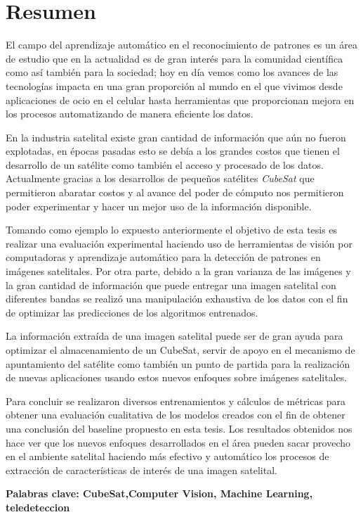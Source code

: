 \chapter*{Resumen}
\label{chap:resumen}

El campo del aprendizaje automático en el reconocimiento de patrones es un área de estudio que en la actualidad es de gran interés para la comunidad científica como así también para la sociedad; hoy en día vemos como los avances de las tecnologías impacta en una gran proporción al mundo en el que vivimos desde aplicaciones de ocio en el celular hasta herramientas que proporcionan mejora en los procesos automatizando de manera eficiente los datos.

En la industria satelital existe gran cantidad de información que aún no fueron explotadas, en épocas pasadas esto se debía a los grandes costos que tienen el desarrollo de un satélite como también el acceso y procesado de los datos. Actualmente gracias a los desarrollos de pequeños satélites \textit{CubeSat} que permitieron abaratar costos y al avance del poder de cómputo nos permitieron poder experimentar y hacer un mejor uso de la información disponible.

Tomando como ejemplo lo expuesto anteriormente el objetivo de esta tesis es realizar una evaluación experimental haciendo uso  de herramientas de visión por computadoras y aprendizaje automático para la detección de patrones en imágenes satelitales. 
Por otra parte, debido a la gran varianza de las imágenes y la gran cantidad de información que puede entregar una imagen satelital con diferentes bandas se realizó una manipulación exhaustiva de los datos con el fin de optimizar las predicciones de los algoritmos entrenados. 

La información extraída de una imagen satelital puede ser de gran ayuda para optimizar el almacenamiento de un CubeSat, servir de apoyo en el mecanismo de apuntamiento del satélite como también un punto de partida para la realización de nuevas aplicaciones usando estos nuevos enfoques sobre imágenes satelitales.

Para concluir se realizaron diversos entrenamientos y cálculos de métricas para obtener una evaluación cualitativa de los modelos creados con el fin de obtener una conclusión del baseline propuesto en esta tesis. Los resultados obtenidos nos hace ver que los nuevos enfoques desarrollados en el área pueden sacar provecho en el ambiente satelital haciendo más efectivo y automático los procesos de extracción de características de interés de una imagen satelital.

\textbf{Palabras clave: CubeSat,Computer Vision, Machine Learning, teledeteccion}

